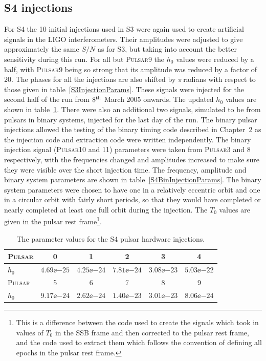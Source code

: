 \subsection{S4 injections}\label{S4injections}
For S4 the 10 initial injections used in S3 were again used to create artificial signals in the LIGO
interferometers. Their amplitudes were adjusted to give approximately the same $S/N$ as for S3, but
taking into account the better sensitivity during this run. For all but P\textsc{ulsar}9 the $h_0$
values were reduced by a half, with P\textsc{ulsar}9 being so strong that its amplitude was
reduced by a factor of 20. The phases for all the injections are also shifted by $\pi$\,radians with
respect to those given in table~\ref{S3InjectionParams}. These signals were injected for the second
half of the run from $8^{\rm th}$ March 2005 onwards. The updated $h_0$ values are shown in
table~\ref{S4InjectionParams}. There were also an additional two signals, simulated to be from
pulsars in binary systems, injected for the last day of the run. The binary pulsar injections
allowed the testing of the binary timing code described in Chapter~2 as the injection code and
extraction code were written independently. The binary injection signal (P\textsc{ulsar}10 and 11)
parameters were taken from P\textsc{ulsar}3 and 8 respectively, with the frequencies changed and
amplitudes increased to make sure they were visible over the short injection time. The frequency,
amplitude and binary system parameters are shown in table~\ref{S4BinInjectionParams}. The binary
system parameters were chosen to have one in a relatively eccentric orbit and one in a circular
orbit with fairly short periods, so that they would have completed or nearly completed at least one
full orbit during the injection. The $T_0$ values are given in the pulsar rest frame\footnote{This
is a difference between the code used to create the signals which took in values of $T_0$ in the SSB
frame and then corrected to the pulsar rest frame, and the code used to extract them which follows
the \tempo convention of defining all epochs in the pulsar rest frame.}.
\begin{table}[!htbp]
\caption{\label{S4InjectionParams} The parameter values for the S4 pulsar hardware injections.}
\begin{center}
\begin{tabular}{l | c c c c c}
P\textsc{ulsar} & 0 & 1 & 2 & 3 & 4 \\
\hline
\footnotesize{$h_0$} & \footnotesize{$4.69\ee{-25}$} & \footnotesize{$4.25\ee{-24}$} &
\footnotesize{$7.81\ee{-24}$} & \footnotesize{$3.08\ee{-23}$} & \footnotesize{$5.03\ee{-22}$} \\
\hline
P\textsc{ulsar} & 5 & 6 & 7 & 8 & 9 \\
\hline
\footnotesize{$h_0$} & \footnotesize{$9.17\ee{-24}$} & \footnotesize{$2.62\ee{-24}$} &
\footnotesize{$1.40\ee{-23}$} & \footnotesize{$3.01\ee{-23}$} & \footnotesize{$8.06\ee{-24}$} \\
\end{tabular}
\end{center}
\end{table}
